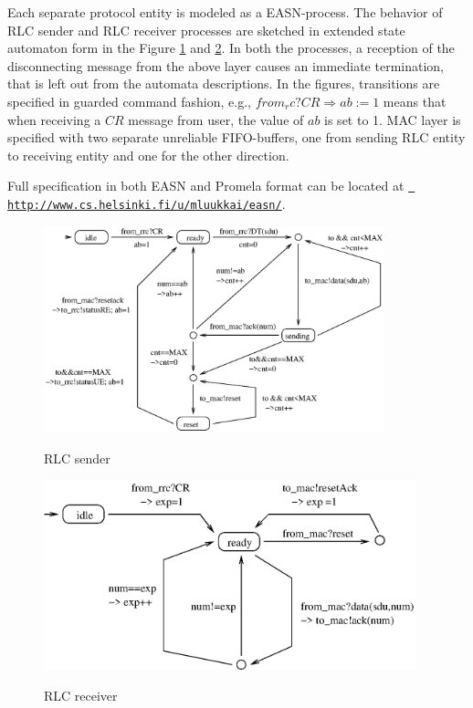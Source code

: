 \documentclass{entcs} \usepackage{entcsmacro}
\begin{document}
Each separate protocol entity is modeled as a EASN-process. The behavior
of RLC sender and RLC receiver processes are sketched in extended state
automaton form in the Figure \ref{rlcent1} and \ref{rlcent2}. 
In both the processes, a reception
of the disconnecting message from the above layer causes an immediate
termination, that is left out from the automata descriptions. In the
figures, transitions are specified in guarded command fashion, e.g.,
$from_rc?CR \Rightarrow ab:=1$ means that when receiving a $CR$ message from
user, the value of $ab$ is set to 1. MAC layer is specified with two
separate unreliable FIFO-buffers, one from sending RLC entity to
receiving entity and one for the other direction.

Full specification in both EASN and Promela format can be located at
\href{http://www.cs.helsinki.fi/u/mluukkai/easn/}{\tt
http://www.cs.helsinki.fi/u/mluukkai/easn/}.


\begin{figure}
\begin{center}
  \includegraphics[height=6.0cm]{srlc.eps}\\
  \caption{RLC sender}
  \label{rlcent1}
\end{center}
\end{figure}



\begin{figure}
\begin{center}
  \includegraphics[height=5.5cm]{rrlc.new.eps}\\
  \caption{RLC receiver}
  \label{rlcent2}
\end{center}
\end{figure}
\end{document}
